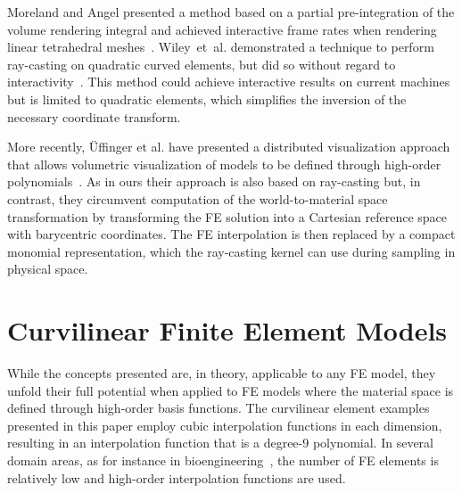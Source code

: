 \documentclass[journal]{vgtc}                %
\begin{document}
Moreland and Angel presented a method based on a partial pre-integration of the volume rendering integral and achieved interactive frame rates when rendering linear tetrahedral meshes~\cite{morelandVolRen04}. Wiley~et~al. demonstrated a technique to perform ray-casting on quadratic curved elements, but did so without regard to interactivity~\cite{wileyraycasting04}. This method could achieve interactive results on current machines but is limited to quadratic elements, which simplifies the inversion of the necessary coordinate transform.

More recently, {\"U}ffinger et al. have presented a distributed visualization approach that allows volumetric visualization of models to be defined through high-order polynomials~\cite{uffinger10femraycasting}. As in ours their approach is also based on ray-casting but, in contrast, they circumvent computation of the world-to-material space transformation by transforming the FE solution into a Cartesian reference space with barycentric coordinates. The FE interpolation is then replaced by a compact monomial representation, which the ray-casting kernel can use during sampling in physical space.
%
%
%
\section{Curvilinear Finite Element Models}\label{sec:theory}
While the concepts presented are, in theory, applicable to any FE model, they unfold their full potential when applied to FE models where the material space is defined through high-order basis functions. The curvilinear element examples presented in this paper employ cubic interpolation functions in each dimension, resulting in an interpolation function that is a degree-9 polynomial. In several domain areas, as for instance in bioengineering~\cite{lee10deformation,wuensche03deformation}, the number of FE elements is relatively low and high-order interpolation functions are used.
\end{document}
